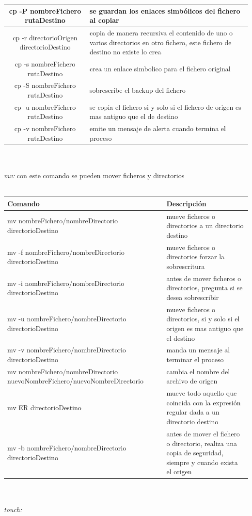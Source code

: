 \documentclass[10pt,a4paper,titlepage]{article}
\begin{document}
\begin{tabular}{|c|p{8cm}|}
		\hline
		cp -P nombreFichero rutaDestino & se guardan los enlaces simbólicos del fichero al copiar \\
		\hline
		cp -r directorioOrigen directorioDestino & copia de manera recursiva el contenido de uno o varios directorios en otro fichero, este fichero de destino no existe lo crea \\
		\hline
		cp -s nombreFichero rutaDestino & crea un enlace simbolico para el fichero original \\
		\hline
		cp -S nombreFichero rutaDestino & sobrescribe el backup del fichero \\
		cp -u nombreFichero rutaDestino & se copia el fichero si y solo si el fichero de origen es mas antiguo que el de destino \\
		\hline
		cp -v nombreFichero rutaDestino & emite un mensaje de alerta cuando termina el proceso \\
		\hline
	\end{tabular}
	\\
	\\
	\emph{mv:} con este comando se pueden mover ficheros y directorios
	\\
	\\
	\begin{tabular}{|p{7cm}|p{7cm}|}
		\hline
		Comando & Descripción \\
		\hline
		mv nombreFichero/nombreDirectorio directorioDestino & mueve ficheros o directorios a un directorio destino \\
		\hline
		mv -f nombreFichero/nombreDirectorio directorioDestino & mueve ficheros o directorios forzar la sobrescritura \\
		\hline
		mv -i nombreFichero/nombreDirectorio directorioDestino & antes de mover ficheros o directorios, pregunta si se desea sobrescribir \\
		\hline
		mv -u nombreFichero/nombreDirectorio directorioDestino & mueve ficheros o directorios, si y solo si el origen es mas antiguo que el destino \\
		\hline
		mv -v nombreFichero/nombreDirectorio directorioDestino & manda un mensaje al terminar el proceso \\
		\hline
		mv nombreFichero/nombreDirectorio nuevoNombreFichero/nuevoNombreDirectorio & cambia el nombre del archivo de origen \\
		\hline
		mv ER directorioDestino & mueve todo aquello que coincida con la expresión regular dada a un directorio destino \\
		\hline
		mv -b nombreFichero/nombreDirectorio directorioDestino & antes de mover el fichero o directorio, realiza una copia de seguridad, siempre y cuando exista el origen \\
		\hline
	\end{tabular}
	\\
	\\
	\emph{touch:}
	
\end{document}
